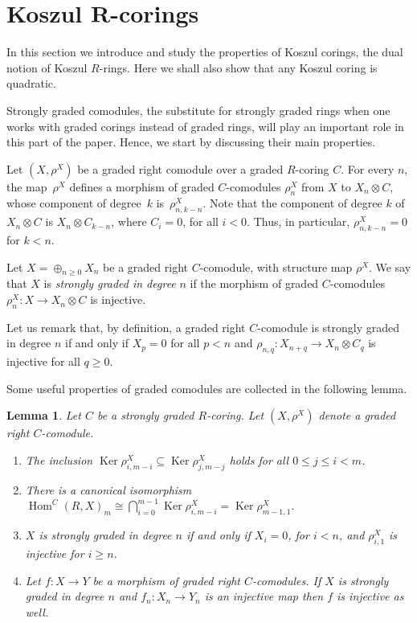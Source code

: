 \documentclass[11pt]{article}
\DeclareMathOperator{\Ker}{Ker}
\newcommand\ot{\otimes}
\renewcommand{\^}[1]{\mbox{$^{\left( #1 \right)}$}}
\renewcommand{\_}[1]{\mbox{$_{\left( #1 \right)}$}}
\newcommand\Hom{\operatorname{Hom}}
\numberwithin{equation}{section}
\newtheorem{Lemma}[Theorem]{Lemma}
\begin{document}
\section[Koszul $R$-corings]{Koszul $\boldsymbol{R}$-corings}\label{section4}

In this section we introduce and study the properties of Koszul corings, the dual notion of Koszul $R$-rings. Here we shall also show that any Koszul coring is quadratic.

Strongly graded comodules, the substitute for strongly graded rings when one works with graded corings instead of graded rings, will play an important role in this part of the paper. Hence, we start by discussing their main properties.

Let $(X,\rho^X)$ be a graded right comodule over a graded $R$-coring $C$. For every $n$, the map~$\rho^X$ def\/ines a morphism of graded $C$-comodules $\rho_n^X$ from $X$ to $X_n\ot C$, whose component of degree~$k$ is~$\rho_{n,k-n}^X$. Note that the component of degree $k$ of $X_n\ot C$ is $X_n\ot C_{k-n}$, where $C_i=0$, for all $i<0$. Thus, in particular, $\rho_{n,k-n}^X=0$ for $k<n$.

\begin{Definition}\label{de:strongly_graded_n}
Let $X=\oplus_{n\geq 0} X_n$ be a graded right $C$-comodule, with structure map $\rho^X$. We say that $X$ is \emph{strongly graded in degree} $n$ if the morphism of graded $C$-comodules $\rho^X_{n} \colon X \rightarrow X_n \otimes C$ is injective.
\end{Definition}

Let us remark that, by def\/inition, a graded right $C$-comodule is strongly graded in degree $n$ if and only if $X_p=0$ for all $p<n$ and $\rho_{n,q}\colon X_{n+q}\to X_n\ot C_q$ is injective for all $q\geq 0$.

Some useful properties of graded comodules are collected in the following lemma.

\begin{Lemma}\label{le:strongly_graded_n}
Let $C$ be a strongly graded $R$-coring. Let $(X,\rho^X)$ denote a graded right $C$-comodule.
\begin{enumerate}\itemsep=0pt
 \item[$1.$] The inclusion $\Ker\rho^X_{i,m-i}\subseteq \Ker\rho^X_{j,m-j}$ holds for all $0\leq j\leq i < m$.

 \item[$2.$] There is a canonical isomorphism $\Hom^C(R,X)_m\cong\bigcap_{i=0}^{m-1}\Ker\rho^X_{i,m-i}=\Ker\rho^X_{m-1,1}$.

 \item[$3.$] $X$ is strongly graded in degree $n$ if and only if $X_i=0$, for $i<n$, and $\rho_{i,1}^X$ is injective for $i\geq n$.

 \item[$4.$] Let $f\colon X\to Y$ be a morphism of graded right $C$-comodules. If $X$ is strongly graded in degree $n$ and $f_n\colon X_n\to Y_n$ is an injective map then $f$ is injective as well.
 \end{enumerate}
\end{Lemma}
\end{document}
